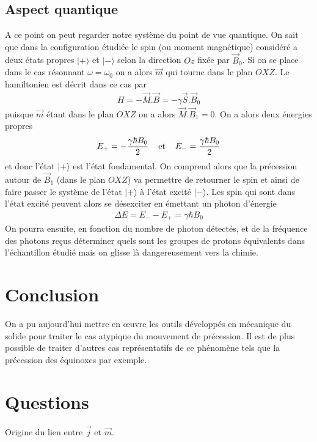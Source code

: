 \documentclass[12pt,prb,aps,epsf]{article}
\begin{document}
\subsection{Aspect quantique}
A ce point on peut regarder notre système du point de vue quantique. On sait que dans la configuration étudiée le spin (ou moment magnétique) considéré a deux états propres $|+\rangle$ et $|-\rangle$ selon la direction $Oz$ fixée par $\vec{B}_0$. Si on se place dans le cas résonnant $\omega = \omega_0$ on a alors $\vec{m}$ qui tourne dans le plan $OXZ$. Le hamiltonien est décrit dans ce cas par 
\begin{eqnarray}
H = -\vec{M}.\vec{B} = - \gamma \vec{S}.\vec{B}_0
\end{eqnarray}
puisque $\vec{m}$ étant dans le plan $OXZ$ on a alors $\vec{M}.\vec{B}_1 = 0$.
On a alors deux énergies propres 
\begin{eqnarray}
E_+ = -\frac{\gamma\hbar B_0}{2}\hspace{0.4cm}\mathrm{et}\hspace{0.4cm}E_- = \frac{\gamma\hbar B_0}{2}
\end{eqnarray}
et donc l'état $|+\rangle$ est l'état fondamental. On comprend alors que la précession autour de $\vec{B}_1$ (dans le plan $OXZ$) va permettre de retourner le spin et ainsi de faire passer le système de l'état $|+\rangle$ à l'état excité $|-\rangle$. Les spin qui sont dans l'état excité peuvent alors se désexciter en émettant un photon d'énergie 
\begin{eqnarray}
\Delta E = E_- - E_+ = \gamma\hbar B_0
\end{eqnarray}
On pourra ensuite, en fonction du nombre de photon détectés, et de la fréquence des photons reçus déterminer quels sont les groupes de protons équivalents dans l'échantillon étudié mais on glisse là dangereusement vers la chimie.

\section{Conclusion}
On a pu aujourd'hui mettre en œuvre les outils développés en mécanique du solide pour traiter le cas atypique du mouvement de précession. Il est de plus possible de traiter d'autres cas représentatifs de ce phénomène tels que la précession des équinoxes par exemple.

\section*{Questions}
Origine du lien entre $\vec{j}$ et $\vec{m}$.\\
\end{document}
